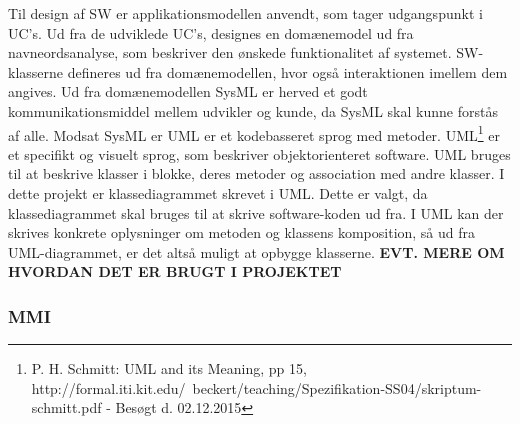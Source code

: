 \newline
Til design af SW er applikationsmodellen anvendt, som tager udgangspunkt i UC's. Ud fra de udviklede UC's, designes en domænemodel ud fra navneordsanalyse, som beskriver den ønskede funktionalitet af systemet. SW-klasserne defineres ud fra domænemodellen, hvor også interaktionen imellem dem angives. Ud fra domænemodellen 
SysML er herved et godt kommunikationsmiddel mellem udvikler og kunde, da SysML skal kunne forstås af alle. 
\newline
Modsat SysML er UML er et kodebasseret sprog med metoder.
UML\footnote{P. H. Schmitt: UML and its Meaning, pp 15, http://formal.iti.kit.edu/~beckert/teaching/Spezifikation-SS04/skriptum-schmitt.pdf - Besøgt d. 02.12.2015} er et specifikt og visuelt sprog, som beskriver objektorienteret software. UML bruges til at beskrive klasser i blokke, deres metoder og association med andre klasser. I dette projekt er klassediagrammet skrevet i UML. Dette er valgt, da klassediagrammet skal bruges til at skrive software-koden ud fra. I UML kan der skrives konkrete oplysninger om metoden og klassens komposition, så ud fra UML-diagrammet, er det altså muligt at opbygge klasserne. \textbf{EVT. MERE OM HVORDAN DET ER BRUGT I PROJEKTET}


\subsubsection{MMI}